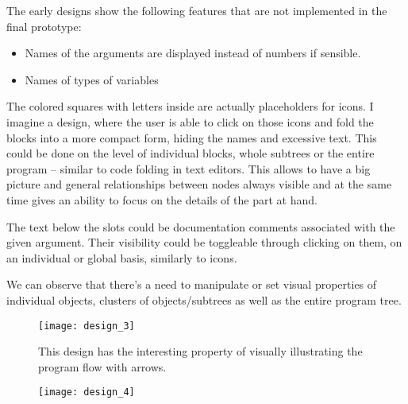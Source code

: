 The early designs show the following features that are not implemented in the
final prototype:
\begin{itemize}
	\item Names of the arguments are displayed instead of numbers if
          sensible.
	\item Names of types of variables
\end{itemize}

The colored squares with letters inside are actually placeholders for icons.  I
imagine a design, where the user is able to click on those icons and fold the
blocks into a more compact form, hiding the names and excessive text. This could
be done on the level of individual blocks, whole subtrees or the entire program
-- similar to code folding in text editors. This allows to have a big picture
and general relationships between nodes always visible and at the same time
gives an ability to focus on the details of the part at hand.

The text below the slots could be documentation comments associated with the
given argument. Their visibility could be toggleable through clicking on them,
on an individual or global basis, similarly to icons.

We can observe that there's a need to manipulate or set visual properties of
individual objects, clusters of objects/subtrees as well as the entire program
tree.


\begin{figure}[h!]
\centering \texttt{[image: design\_3]}
\caption{This design has the interesting property of visually illustrating the
  program flow with arrows.}
\label{fig:design_3}
\end{figure}


\begin{figure}[h!]
\centering \texttt{[image: design\_4]}
\caption{}
\label{fig:design_4}
\end{figure}

